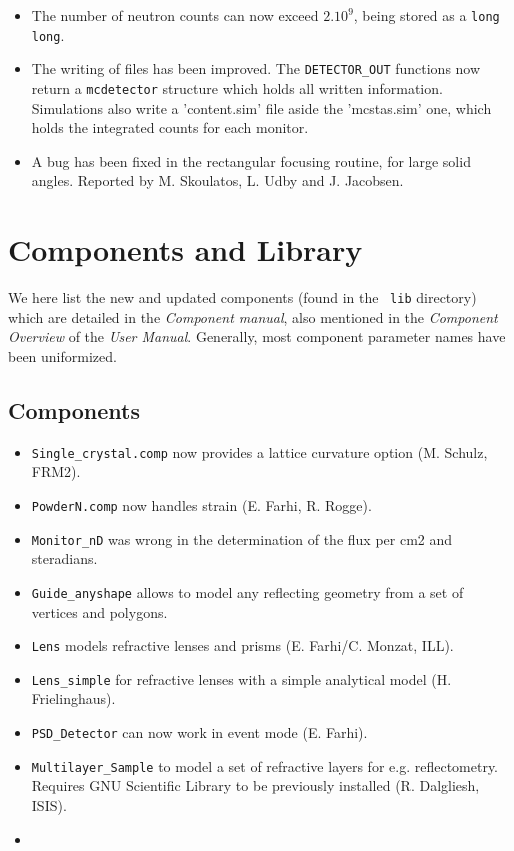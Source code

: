 \begin{itemize}
\item The number of neutron counts can now exceed $2.10^9$, being stored as a \verb+long long+.
\item The writing of files has been improved. The \verb+DETECTOR_OUT+ functions now return a \verb+mcdetector+ structure which holds all written information. Simulations also write a 'content.sim' file aside the 'mcstas.sim' one, which holds the integrated counts for each monitor.
\item A bug has been fixed in the rectangular focusing routine, for large solid angles. Reported by M. Skoulatos, L. Udby and J. Jacobsen.
\end{itemize}

\section{Components and Library}
\label{s:new-features:components}
 
We here list the new and updated components (found in the \MCS\ \verb+lib+ directory)
which are detailed in the {\it Component manual}, also mentioned in
the {\it Component Overview} of the {\it User Manual}. Generally, most component parameter names have been uniformized.

\subsection{Components}
\begin{itemize}
\item \verb+Single_crystal.comp+ now provides a lattice curvature option (M. Schulz, FRM2).
\item \verb+PowderN.comp+ now handles strain (E. Farhi, R. Rogge).
\item \verb+Monitor_nD+ was wrong in the determination of the flux per cm2 and steradians.
\item \verb+Guide_anyshape+ allows to model any reflecting geometry from a set of vertices and polygons.
\item \verb+Lens+ models refractive lenses and prisms (E. Farhi/C. Monzat, ILL).
\item \verb+Lens_simple+ for refractive lenses with a simple analytical model (H. Frielinghaus).
\item \verb+PSD_Detector+ can now work in event mode (E. Farhi).
\item \verb+Multilayer_Sample+ to model a set of refractive layers for e.g. reflectometry. Requires GNU Scientific Library to be previously installed (R. Dalgliesh, ISIS).
\item 
\end{itemize}

